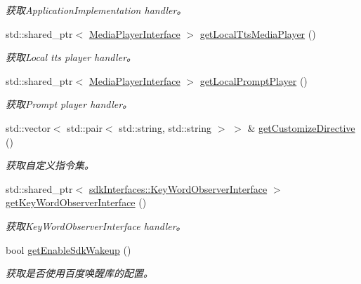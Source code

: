 \begin{DoxyCompactItemize}
\begin{DoxyCompactList}\small\item\em 获取\+Application\+Implementation handler。 \end{DoxyCompactList}\item 
std\+::shared\+\_\+ptr$<$ \hyperlink{classduerOSDcsSDK_1_1sdkInterfaces_1_1MediaPlayerInterface}{Media\+Player\+Interface} $>$ \hyperlink{structduerOSDcsSDK_1_1sdkInterfaces_1_1DcsSdkParameters_acda5dfd2e1e9a8eb07d0613b61f37642}{get\+Local\+Tts\+Media\+Player} ()
\begin{DoxyCompactList}\small\item\em 获取\+Local tts player handler。 \end{DoxyCompactList}\item 
std\+::shared\+\_\+ptr$<$ \hyperlink{classduerOSDcsSDK_1_1sdkInterfaces_1_1MediaPlayerInterface}{Media\+Player\+Interface} $>$ \hyperlink{structduerOSDcsSDK_1_1sdkInterfaces_1_1DcsSdkParameters_aeb569e85ff702f3ec9794e99e7e9cab1}{get\+Local\+Prompt\+Player} ()
\begin{DoxyCompactList}\small\item\em 获取\+Prompt player handler。 \end{DoxyCompactList}\item 
std\+::vector$<$ std\+::pair$<$ std\+::string, std\+::string $>$ $>$ \& \hyperlink{structduerOSDcsSDK_1_1sdkInterfaces_1_1DcsSdkParameters_a0622206b1833f62c98e79de840698645}{get\+Customize\+Directive} ()
\begin{DoxyCompactList}\small\item\em 获取自定义指令集。 \end{DoxyCompactList}\item 
std\+::shared\+\_\+ptr$<$ \hyperlink{classduerOSDcsSDK_1_1sdkInterfaces_1_1KeyWordObserverInterface}{sdk\+Interfaces\+::\+Key\+Word\+Observer\+Interface} $>$ \hyperlink{structduerOSDcsSDK_1_1sdkInterfaces_1_1DcsSdkParameters_a50665d3ef7fcfcfbe08b38cfbf9c26cf}{get\+Key\+Word\+Observer\+Interface} ()
\begin{DoxyCompactList}\small\item\em 获取\+Key\+Word\+Observer\+Interface handler。 \end{DoxyCompactList}\item 
bool \hyperlink{structduerOSDcsSDK_1_1sdkInterfaces_1_1DcsSdkParameters_a7260bc59f129332b464b8574ca101662}{get\+Enable\+Sdk\+Wakeup} ()
\begin{DoxyCompactList}\small\item\em 获取是否使用百度唤醒库的配置。 \end{DoxyCompactList}\end{DoxyCompactItemize}


